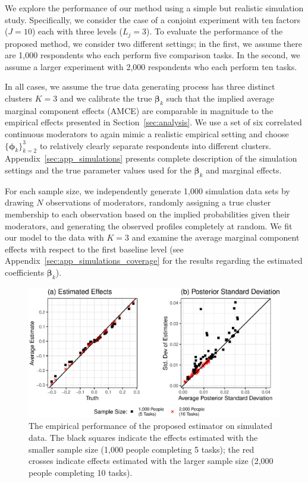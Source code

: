 We explore the performance of our method using a simple but realistic
simulation study.  Specifically, we consider the case of a conjoint
experiment with ten factors ($J = 10$) each with three levels
($L_j = 3$). To evaluate the performance of the proposed method, we
consider two different settings; in the first, we assume there are
1,000 respondents who each perform five comparison tasks. In the
second, we assume a larger experiment with 2,000 respondents who each
perform ten tasks.

In all cases, we assume the true data generating process has three
distinct clusters $K = 3$ and we calibrate the true $\bm{\beta}_k$
such that the implied average marginal component effects (AMCE) are comparable in
magnitude to the empirical effects presented in
Section~\ref{sec:analysis}. We use a set of six correlated continuous
moderators to again mimic a realistic empirical setting and choose
$\{\bm{\phi}_k\}_{k=2}^3$ to relatively clearly separate respondents into different clusters.  Appendix~\ref{sec:app_simulations} presents complete
description of the simulation settings and the true parameter values
used for the $\bm{\beta}_k$ and marginal effects.

For each sample size, we independently generate 1,000 simulation data
sets by drawing $N$ observations of moderators, randomly assigning a
true cluster membership to each observation based on the implied
probabilities given their moderators, and generating the observed
profiles completely at random. We fit our model to the data with
$K = 3$ and examine the average marginal component effects with respect to the
first baseline level (see Appendix~\ref{sec:app_simulations_coverage}
for the results regarding the estimated coefficients $\bm{\beta}_k$).

\begin{figure}[!t]
  \centering {}
  \includegraphics[width=\textwidth]{figures/sim_ame.eps}
  \caption{The empirical performance of the proposed estimator on
    simulated data. The black squares indicate the effects estimated
    with the smaller sample size (1,000 people completing 5 tasks);
    the red crosses indicate effects estimated with the larger sample
    size (2,000 people completing 10 tasks).}
  \label{fig:simulation}
\end{figure}

